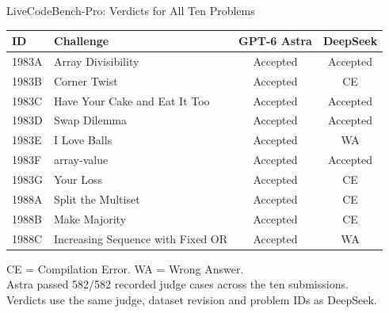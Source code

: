 \begin{frame}{LiveCodeBench-Pro: Verdicts for All Ten Problems}
\footnotesize
\begin{tabular}{llcc}\toprule
ID & Challenge & GPT-6 Astra & DeepSeek \\\midrule
1983A & Array Divisibility & Accepted & Accepted \\
1983B & Corner Twist & Accepted & CE \\
1983C & Have Your Cake and Eat It Too & Accepted & Accepted \\
1983D & Swap Dilemma & Accepted & Accepted \\
1983E & I Love Balls & Accepted & WA \\
1983F & array-value & Accepted & Accepted \\
1983G & Your Loss & Accepted & CE \\
1988A & Split the Multiset & Accepted & CE \\
1988B & Make Majority & Accepted & CE \\
1988C & Increasing Sequence with Fixed OR & Accepted & WA \\
\bottomrule\end{tabular}
\vfill\footnotesize
CE = Compilation Error. WA = Wrong Answer.\\
Astra passed 582/582 recorded judge cases across the ten submissions.\\
Verdicts use the same judge, dataset revision and problem IDs as DeepSeek.
\end{frame}
